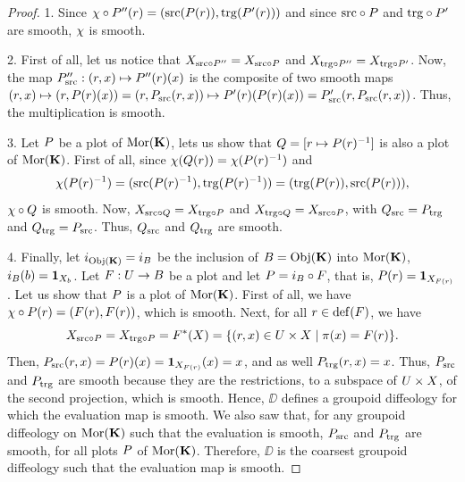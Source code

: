 \begin{proof}
  1. Since $\car \circ \P''(r) = (\source(\P(r)), \target(\P'(r)))$ and since $\source \circ \P$ and $\target \circ \P'$ are smooth, $\car$ is smooth.
  
  2. First of all,
  let us notice that $\X_{\source \circ \P''} = \X_{\source \circ \P}$ and $\X_{\target \circ \P''} = \X_{\target \circ \P'}$.
  Now,
  the map $\P''_\source : (r,x) \mapsto \P''(r)(x)$ is the composite of two smooth maps $(r,x) \mapsto (r, \P(r)(x)) = (r, \P_\source(r,x)) \mapsto \P'(r)(\P(r)(x)) = \P'_\source(r,\P_\source(r,x))$.
  Thus,
  the multiplication is smooth.
  
  3. Let $\P$ be a plot of $\Mor(\KK)$,
  lets us show that $\Q = [r \mapsto \P(r)^{-1}]$ is also a plot of $\Mor(\KK)$.
  First of all, since $\car(\Q(r)) = \car(\P(r)^{-1})$ and
  $$%
  \car(\P(r)^{-1}) = (\source(\P(r)^{-1}), \target(\P(r)^{-1})) = (\target(\P(r)), \source(\P(r))),
  $$%
  $\car \circ \Q$ is smooth.
  Now,
  $\X_{\source \circ \Q} = \X_{\target \circ \P}$ and $\X_{\target \circ \Q} = \X_{\source \circ \P}$,
  with
  $\Q_\source = \P_\target$ and $\Q_\target = \P_\source$.
  Thus, $\Q_\source$ and $\Q_\target$ are smooth.
  
  4. Finally,
  let $i_{\Obj(\KK)} = i_\B$ be the inclusion of $\B = \Obj(\KK)$ into $\Mor(\KK)$,
  $i_\B(b) = \id_{\X_b}$.
  Let $\F : \U \to \B$ be a plot and let $\P = i_\B \circ \F$,
  that is,
  $\P(r) = \id_{\X_{\F(r)}}$.
  Let us show that $\P$ is a plot of $\Mor(\KK)$.
  First of all,
  we have $\car \circ \P(r) = (\F(r),\F(r))$,
  which is smooth.
  Next,
  for all $r \in \Def(\F)$,
  we have
  $$%
  \X_{\source \circ \P} = \X_{\target \circ \P} = \F^*(\X) = \{ (r,x) \in \U \times \X \mid \pi(x) = \F(r) \}.
  $$%
  Then,
  $\P_\source(r,x) = \P(r)(x) = \id_{\X_{\F(r)}}(x) = x$,
  and as well $\P_\target(r,x) = x$.
  Thus,
  $\P_\source$ and
  $\P_\target$ are smooth because  they are the restrictions,
  to a subspace of $\U \times \X$,
  of the second projection,
  which is smooth.
  Hence,
  $\DD$ defines a groupoid diffeology for which the evaluation map is smooth.
  We also saw that,
  for any groupoid diffeology on $\Mor(\KK)$ such that the evaluation is smooth,
  $\P_\source$ and $\P_\target$ are smooth,
  for all plots $\P$ of $\Mor(\KK)$.
  Therefore,
  $\DD$ is the coarsest groupoid diffeology such that the evaluation map is smooth.
\end{proof}

